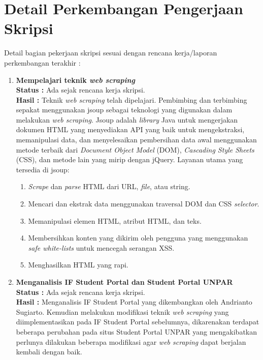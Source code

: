 \documentclass[a4paper,twoside]{article}
\begin{document}
\section{Detail Perkembangan Pengerjaan Skripsi}
Detail bagian pekerjaan skripsi sesuai dengan rencana kerja/laporan perkembangan terakhir :
	\begin{enumerate}
		\item \textbf{Mempelajari teknik \textit{web scraping}}\\
		{\bf Status :} Ada sejak rencana kerja skripsi.\\
		{\bf Hasil :} Teknik \textit{web scraping} telah dipelajari. Pembimbing dan terbimbing sepakat menggunakan jsoup sebagai teknologi yang digunakan dalam melakukan \textit{web scraping}. Jsoup adalah \textit{library} Java untuk mengerjakan dokumen HTML yang menyediakan API yang baik untuk mengekstraksi, memanipulasi data, dan menyelesaikan pembersihan data awal menggunakan metode terbaik dari \textit{Document Object Model} (DOM), \textit{Cascading Style Sheets} (CSS), dan metode lain yang mirip dengan jQuery. Layanan utama yang tersedia di jsoup:
        \begin{enumerate}
            \item \textit{Scrape} dan \textit{parse} HTML dari URL, \textit{file}, atau string.
            \item Mencari dan ekstrak data menggunakan traversal DOM dan CSS \textit{selector}.
            \item Memanipulasi elemen HTML, atribut HTML, dan teks.
            \item Membersihkan konten yang dikirim oleh pengguna yang menggunakan \textit{safe white-lists} untuk mencegah serangan XSS.
            \item Menghasilkan HTML yang rapi.
        \end{enumerate}
		
		
		\item \textbf{Menganalisis IF Student Portal dan Student Portal UNPAR}\\
		{\bf Status :} Ada sejak rencana kerja skripsi.\\
		{\bf Hasil :} Menganalisis IF Student Portal yang dikembangkan oleh Andrianto Sugiarto. Kemudian melakukan modifikasi teknik \textit{web scraping} yang diimplementasikan pada IF Student Portal sebelumnya, dikarenakan terdapat beberapa perubahan pada situs Student Portal UNPAR yang mengakibatkan perlunya dilakukan beberapa modifikasi agar \textit{web scraping} dapat berjalan kembali dengan baik.



\end{enumerate}
\end{document}
